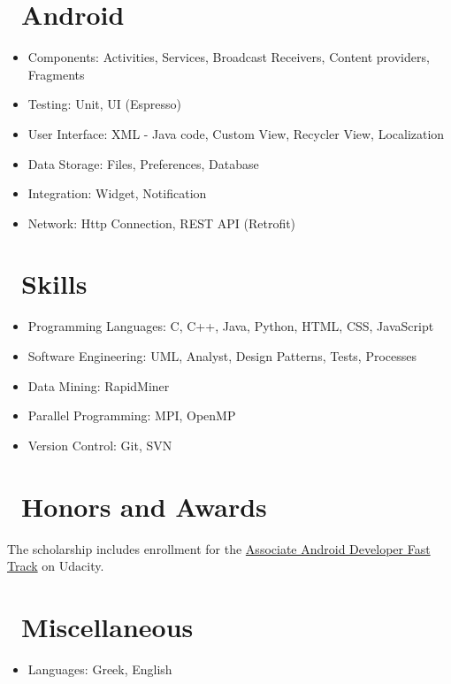 \documentclass{resume}
\begin{document}
\section{\faAndroid\ Android}
\begin{itemize}[parsep=0.5ex]
  \item Components: Activities, Services, Broadcast Receivers, Content providers, Fragments
  \item Testing: Unit, UI (Espresso)
  \item User Interface: XML - Java code, Custom View, Recycler View, Localization
  \item Data Storage: Files, Preferences, Database
    \item Integration: Widget, Notification
    \item Network: Http Connection, REST API (Retrofit)
\end{itemize}

\section{\faCogs\ Skills}
\begin{itemize}[parsep=0.5ex]
  \item Programming Languages: C, C++, Java, Python, HTML, CSS, JavaScript
  \item Software Engineering: UML, Analyst, Design Patterns, Tests, Processes
  \item Data Mining: RapidMiner
  \item Parallel Programming: MPI, OpenMP
  \item Version Control: Git, SVN
\end{itemize}

\section{\faHeartO\ Honors and Awards}
The scholarship includes enrollment for the \href{https://www.udacity.com/course/associate-android-developer-fast-track--nd818}{Associate Android Developer Fast Track} on Udacity. 

\section{\faInfo\ Miscellaneous}
\begin{itemize}[parsep=0.5ex]
  \item Languages: Greek, English
\end{itemize}

%
%
\end{document}
